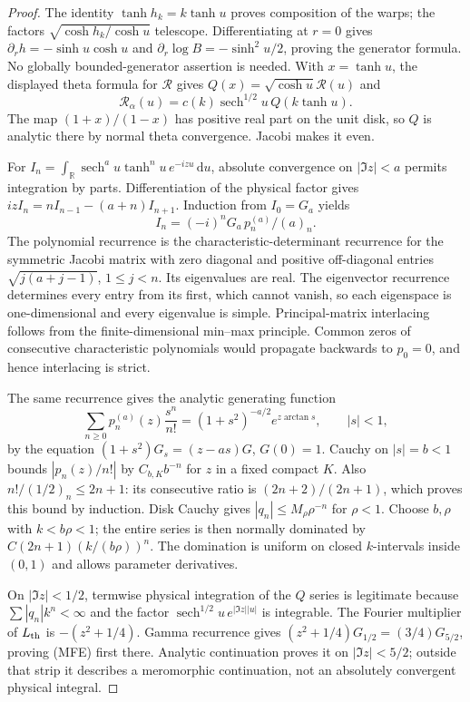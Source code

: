 \documentclass[11pt]{article}
\theoremstyle{remark}\newtheorem{remark}[theorem]{Remark}
\newcommand{\R}{\mathbb R}
\newcommand{\dd}{\,\mathrm d}
\begin{document}
\begin{proof}
The identity $\tanh h_k=k\tanh u$ proves composition of the warps;
the factors $\sqrt{\cosh h_k/\cosh u}$ telescope. Differentiating
at $r=0$ gives $\partial_rh=-\sinh u\cosh u$ and
$\partial_r\log B=-\sinh^2u/2$, proving the generator formula.
No globally bounded-generator assertion is needed.
With $x=\tanh u$, the displayed theta formula for $\mathcal R$ gives
$Q(x)=\sqrt{\cosh u}\mathcal R(u)$ and
\[
 \mathcal R_\alpha(u)
       =c(k)\operatorname{sech}^{1/2}u\,Q(k\tanh u).
\]
The map $(1+x)/(1-x)$ has positive real part on the unit disk,
so $Q$ is analytic there by normal theta convergence. Jacobi makes
it even.

For $I_n=\int_\R\operatorname{sech}^{a}u\tanh^n u\,e^{-izu}\dd u$,
absolute convergence on $|\Im z|<a$ permits integration by parts.
Differentiation of the physical factor gives
$izI_n=nI_{n-1}-(a+n)I_{n+1}$. Induction from $I_0=G_a$ yields
\[
 I_n=(-i)^nG_a\,p_n^{(a)}/(a)_n.
\]
The polynomial recurrence is the characteristic-determinant recurrence
for the symmetric Jacobi matrix with zero diagonal and positive
off-diagonal entries $\sqrt{j(a+j-1)}$, $1\le j<n$.
Its eigenvalues are real. The eigenvector recurrence determines every
entry from its first, which cannot vanish, so each eigenspace is
one-dimensional and every eigenvalue is simple. Principal-matrix
interlacing follows from the finite-dimensional min--max principle.
Common zeros of consecutive characteristic polynomials would propagate
backwards to $p_0=0$, and hence interlacing is strict.

The same recurrence gives the analytic generating function
\[
 \sum_{n\ge0}p_n^{(a)}(z)\frac{s^n}{n!}
            =(1+s^2)^{-a/2}e^{z\arctan s},\qquad |s|<1,
\]
by the equation $(1+s^2)G_s=(z-as)G$, $G(0)=1$.
Cauchy on $|s|=b<1$ bounds $|p_n(z)/n!|$ by $C_{b,K}b^{-n}$
for $z$ in a fixed compact $K$. Also
$n!/(1/2)_n\le2n+1$: its consecutive ratio is
$(2n+2)/(2n+1)$, which proves this bound by induction.
Disk Cauchy gives $|q_n|\le M_\rho\rho^{-n}$ for $\rho<1$.
Choose $b,\rho$ with $k<b\rho<1$; the entire series is then normally
dominated by $C(2n+1)(k/(b\rho))^n$. The domination is uniform on
closed $k$-intervals inside $(0,1)$ and allows parameter derivatives.

On $|\Im z|<1/2$, termwise physical integration of the $Q$ series
is legitimate because $\sum|q_n|k^n<\infty$ and the factor
$\operatorname{sech}^{1/2}u\,e^{|\Im z||u|}$ is integrable.
The Fourier multiplier of $L_{\rm th}$ is $-(z^2+1/4)$.
Gamma recurrence gives
$(z^2+1/4)G_{1/2}=(3/4)G_{5/2}$, proving (MFE) first there.
Analytic continuation proves it on $|\Im z|<5/2$; outside that
strip it describes a meromorphic continuation, not an absolutely
convergent physical integral.


\end{proof}
\end{document}
